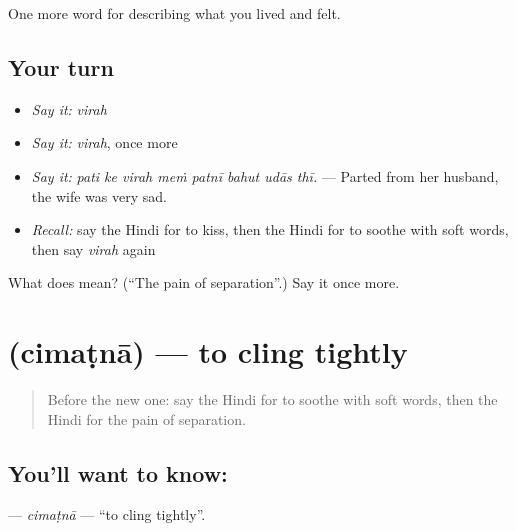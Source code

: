 \begin{grammarlens}[title={What you've built}]
One more word for describing what you lived and felt.
\end{grammarlens}

\subsection*{Your turn}
\begin{itemize}
\raggedright
  \item \emph{Say it:} \emph{virah}
  \item \emph{Say it:} \emph{virah}, once more
  \item \emph{Say it:} \emph{pati ke virah meṁ patnī bahut udās thī.} — Parted from her husband, the wife was very sad.
  \item \emph{Recall:} say the Hindi for to kiss, then the Hindi for to soothe with soft words, then say \emph{virah} again
\end{itemize}

\begin{tcolorbox}[breakable,colback=teal!4,colframe=teal!35!black,title={Before you move on}]
What does  mean? (\textquotedblleft{}The pain of separation\textquotedblright{}.) Say it once more.
\end{tcolorbox}
\section[\texorpdfstring{\hi{चिमटना} (cimaṭnā)}{चिमटना (cimaṭnā)}]{ (cimaṭnā) — to cling tightly}

\label{lesson:HI-C460-cimatna}



\begin{quote}
Before the new one: say the Hindi for to soothe with soft words, then the Hindi for the pain of separation.
\end{quote}

\subsection*{You'll want to know: }
\textbf{} — \emph{cimaṭnā} — \textquotedblleft{}to cling tightly\textquotedblright{}.

\begin{quote}
      
\end{quote}


